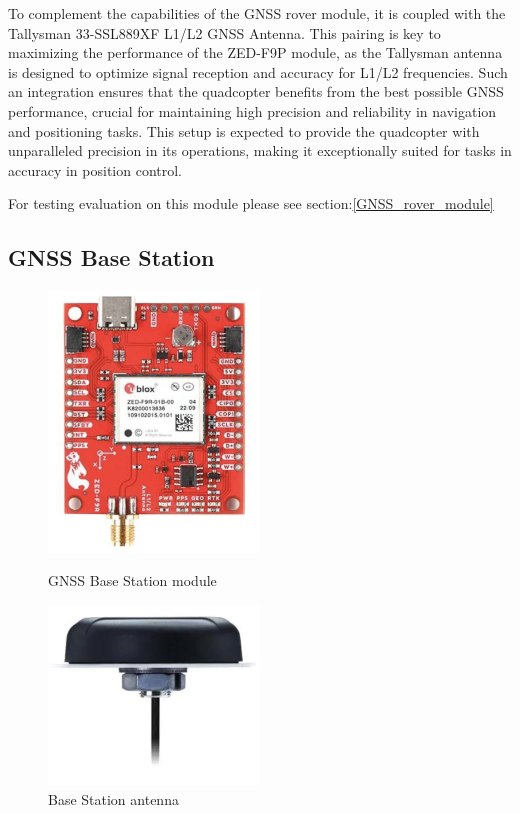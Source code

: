 \documentclass{report}
\begin{document}
To complement the capabilities of the GNSS rover module, it is coupled with the
Tallysman 33-SSL889XF L1/L2 GNSS Antenna. This pairing is key to maximizing the
performance of the ZED-F9P module, as the Tallysman antenna is designed to
optimize signal reception and accuracy for L1/L2 frequencies. Such an
integration ensures that the quadcopter benefits from the best possible GNSS
performance, crucial for maintaining high precision and reliability in
navigation and positioning tasks. This setup is expected to provide the
quadcopter with unparalleled precision in its operations, making it
exceptionally suited for tasks in accuracy in position control.

For testing evaluation on this module please see section:\ref{GNSS_rover_module}

\subsection{GNSS Base Station}
\begin{figure}[H]
  \begin{minipage}{0.5\textwidth}
    \centering
    \includegraphics[width=0.5\textwidth]{Pictures/gnss_base_station.png}
    \caption{GNSS Base Station module}
    \label{fig:gnss_base_station}
  \end{minipage}
  \begin{minipage}{0.5\textwidth}
    \centering
    \includegraphics[width=0.5\textwidth]{Pictures/base_station_antenna.png}
    \caption{Base Station antenna}
    \label{fig:base_station_antenna}
  \end{minipage}
\end{figure}
\end{document}

